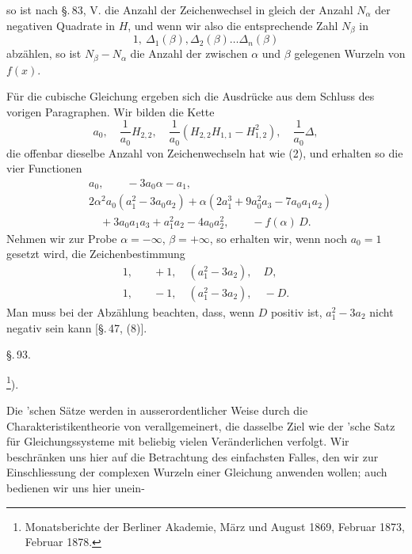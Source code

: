 
so ist nach \S.\,83, V. die Anzahl der Zeichenwechsel in
gleich der Anzahl $N_\alpha$ der negativen Quadrate in $H$, und wenn wir also die entsprechende Zahl $N_\beta$ in
\[
1,\ \varDelta_1(\beta), \varDelta_2(\beta) \dots \varDelta_n(\beta)
\]
abzählen, so ist $N_\beta - N_\alpha$ die Anzahl der zwischen $\alpha$ und $\beta$ gelegenen Wurzeln von $f(x)$.

Für die cubische Gleichung ergeben sich die Ausdrücke aus dem Schluss des vorigen Paragraphen. Wir bilden die Kette
\[
a_0,\quad \frac{1}{a_0} H_{2,2},\quad \frac{1}{a_0}\left(H_{2,2} H_{1,1} - H_{1,2}^2\right),\quad \frac{1}{a_0} \varDelta,
\]
die offenbar dieselbe Anzahl von Zeichenwechseln hat wie (2), und erhalten so die vier Functionen
\[
\begin{aligned}
&a_0,\qquad -3 a_0 \alpha - a_1,\\
&2\alpha^2 a_0(a_1^2 - 3a_0 a_2) + \alpha(2a_1^3 + 9a_0^2a_3 - 7a_0a_1a_2)\\
&\quad + 3a_0a_1a_3 + a_1^2a_2 - 4a_0a_2^2,\qquad -f(\alpha)\,D.
\end{aligned}
\]
Nehmen wir zur Probe $\alpha = -\infty$, $\beta = +\infty$, so erhalten wir, wenn noch $a_0 = 1$ gesetzt wird, die Zeichenbestimmung
\[
\begin{aligned}
1, &\quad +1, \quad (a_1^2 - 3a_2), \quad D,\\
1, &\quad -1, \quad (a_1^2 - 3a_2), \quad -D.
\end{aligned}
\]
Man muss bei der Abzählung beachten, dass, wenn $D$ positiv ist, $a_1^2 - 3a_2$ nicht negativ sein kann [\S.\,47, (8)].

\begin{center}
\S.\,93.

\footnote{Monatsberichte der Berliner Akademie, März und August 1869, Februar 1873, Februar 1878.}).
\end{center}

Die 'schen Sätze werden in ausserordentlicher Weise durch die Charakteristikentheorie von  verallgemeinert, die dasselbe Ziel wie der 'sche Satz für Gleichungssysteme mit beliebig vielen Veränderlichen verfolgt. Wir beschränken uns hier auf die Betrachtung des einfachsten Falles, den wir zur Einschliessung der complexen Wurzeln einer Gleichung anwenden wollen; auch bedienen wir uns hier unein-
